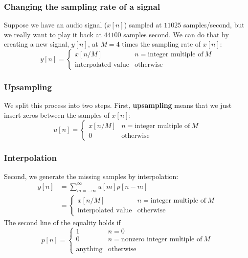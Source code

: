 \documentclass{beamer}
\begin{document}
\begin{frame}
  \frametitle{Changing the sampling rate of a signal}

  Suppose we have an audio signal ($x[n]$) sampled at $11025$
  samples/second, but we really want to play it back at $44100$
  samples second.  We can do that by creating a new signal, $y[n]$, at
  $M=4$ times the sampling rate of $x[n]$:
  \begin{displaymath}
    y[n] = \left\{\begin{array}{ll}
    x[n/M] & n=\text{integer multiple of}~M\\
    \text{interpolated value}&\text{otherwise}
    \end{array}\right.
  \end{displaymath}
\end{frame}

\begin{frame}
  \frametitle{Upsampling}

  We split this process into two steps.  First, {\bf upsampling} means
  that we just insert zeros between the samples of $x[n]$:
  \begin{displaymath}
    u[n] = \left\{\begin{array}{ll}
    x[n/M] & n=\text{integer multiple of}~M\\
    0&\text{otherwise}
    \end{array}\right.
  \end{displaymath}
\end{frame}

\begin{frame}
  \frametitle{Interpolation}

  Second, we generate the missing samples by interpolation:
  \begin{align*}
    y[n] &= \sum_{m=-\infty}^\infty u[m] p[n-m]\\
    &=\left\{\begin{array}{ll}
    x[n/M] & n=\text{integer multiple of}~M\\
    \text{interpolated value}&\text{otherwise}
    \end{array}\right.
  \end{align*}
  The second line of the equality holds if
  \begin{displaymath}
    p[n] =\left\{\begin{array}{ll}
    1 & n=0\\
    0 & n=\text{nonzero integer multiple of}~M\\
    \text{anything}&\text{otherwise}
    \end{array}\right.
  \end{displaymath}
\end{frame}
    
\end{document}

